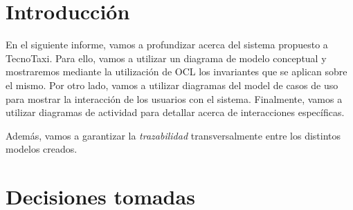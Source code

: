 \documentclass[a4paper, 10pt, twoside]{article}
\begin{document}
\newpage




\tableofcontents

\newpage




\section{Introducción}

En el siguiente informe, vamos a profundizar acerca del sistema propuesto a TecnoTaxi. Para ello, vamos a utilizar un diagrama de modelo conceptual y mostraremos mediante la utilización de OCL los invariantes que se aplican sobre el mismo. Por otro lado, vamos a utilizar diagramas del model de casos de uso para mostrar la interacción de los usuarios con el sistema. Finalmente, vamos a utilizar diagramas de actividad para detallar acerca de interacciones específicas.

Además, vamos a garantizar la \emph{trazabilidad} transversalmente entre los distintos modelos creados.



\section{Decisiones tomadas}

% 
\end{document}
